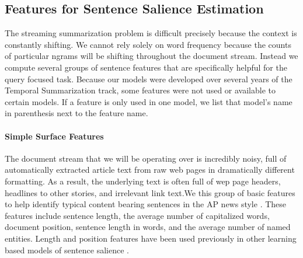 %

\subsection{Features for Sentence Salience Estimation}
\label{sec:features}

The streaming summarization problem is difficult precisely because the context
is constantly shifting. We cannot rely solely on word frequency because
the counts of particular ngrams will be shifting throughout the document
stream. Instead we compute several groups of sentence features that are
specifically helpful for the query focused task. Because our models were
developed over several years of the Temporal Summarization track, some
features were not used or available to certain models. If a feature
is only used in one model, we list that model's name in parenthesis next
to the feature name.



\paragraph{Simple Surface Features} 

The document stream that we will be operating over is incredibly noisy,
full of automatically extracted article text from raw web pages in 
dramatically different formatting. As a result, the underlying text is often
full of wep page headers, headlines to other stories, and irrelevant link text.We this group of basic features to help identify typical content bearing
sentences in the AP news style \citep{ap_style_guide}. These features 
include sentence length, the average number of capitalized words,
document position, sentence length in words, and the average number of 
named entities. Length and position features have been used previously in
other learning based models of sentence salience
\citep{kupiec1995trainable,conroy2001using}.

